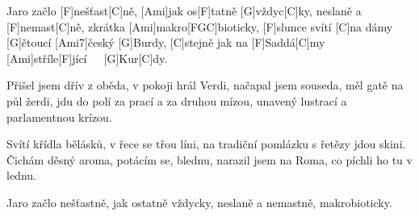 
\sloka
[C]Jaro začlo [F]nešťast[C]ně, [Ami]jak os[F]tatně [G]vždyc[C]ky,
neslaně a [F]nemast[C]ně, zkrátka [Ami]makro[F\!GC]bioticky,
[F]slunce svítí [C]na dámy [G]čtoucí [Ami7]český [G]Burdy,
[C]stejně jak na [F]Saddá[C]my [Ami]stříle[F]jící\ \ \ [G]Kur[C]dy.

\sloka
Přišel jsem dřív z oběda, v pokoji hrál Verdi,
načapal jsem souseda, měl gatě na půl žerdi,
jdu do polí za prací a za druhou mízou,
unavený lustrací a parlamentnou krízou.

\sloka
Svítí křídla bělásků, v řece se třou líni,
na tradiční pomlázku s řetězy jdou skini.
Čichám děsný aroma, potácím se, blednu,
narazil jsem na Roma, co píchli ho tu v lednu.

\hvezda
Jaro začlo nešťastně, jak ostatně vždycky,
neslaně a nemastně, makrobioticky.
